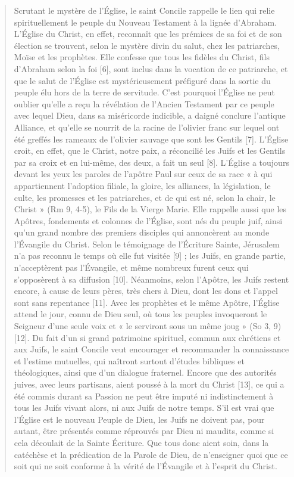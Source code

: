 \begin{quote}
Scrutant le mystère de l’Église, le saint Concile rappelle le lien qui relie spirituellement le peuple du Nouveau Testament à la lignée d’Abraham.
L’Église du Christ, en effet, reconnaît que les prémices de sa foi et de son élection se trouvent, selon le mystère divin du salut, chez les patriarches, Moïse et les prophètes. Elle confesse que tous les fidèles du Christ, fils d’Abraham selon la foi [6], sont inclus dans la vocation de ce patriarche, et que le salut de l’Église est mystérieusement préfiguré dans la sortie du peuple élu hors de la terre de servitude. C’est pourquoi l’Église ne peut oublier qu’elle a reçu la révélation de l’Ancien Testament par ce peuple avec lequel Dieu, dans sa miséricorde indicible, a daigné conclure l’antique Alliance, et qu’elle se nourrit de la racine de l’olivier franc sur lequel ont été greffés les rameaux de l’olivier sauvage que sont les Gentils [7]. L’Église croit, en effet, que le Christ, notre paix, a réconcilié les Juifs et les Gentils par sa croix et en lui-même, des deux, a fait un seul [8].
L’Église a toujours devant les yeux les paroles de l’apôtre Paul sur ceux de sa race « à qui appartiennent l’adoption filiale, la gloire, les alliances, la législation, le culte, les promesses et les patriarches, et de qui est né, selon la chair, le Christ » (Rm 9, 4-5), le Fils de la Vierge Marie. Elle rappelle aussi que les Apôtres, fondements et colonnes de l’Église, sont nés du peuple juif, ainsi qu’un grand nombre des premiers disciples qui annoncèrent au monde l’Évangile du Christ.
Selon le témoignage de l’Écriture Sainte, Jérusalem n’a pas reconnu le temps où elle fut visitée [9] ; les Juifs, en grande partie, n’acceptèrent pas l’Évangile, et même nombreux furent ceux qui s’opposèrent à sa diffusion [10]. Néanmoins, selon l’Apôtre, les Juifs restent encore, à cause de leurs pères, très chers à Dieu, dont les dons et l’appel sont sans repentance [11]. Avec les prophètes et le même Apôtre, l’Église attend le jour, connu de Dieu seul, où tous les peuples invoqueront le Seigneur d’une seule voix et « le serviront sous un même joug » (So 3, 9) [12].
Du fait d’un si grand patrimoine spirituel, commun aux chrétiens et aux Juifs, le saint Concile veut encourager et recommander la connaissance et l’estime mutuelles, qui naîtront surtout d’études bibliques et théologiques, ainsi que d’un dialogue fraternel. Encore que des autorités juives, avec leurs partisans, aient poussé à la mort du Christ [13], ce qui a été commis durant sa Passion ne peut être imputé ni indistinctement à tous les Juifs vivant alors, ni aux Juifs de notre temps. S’il est vrai que l’Église est le nouveau Peuple de Dieu, les Juifs ne doivent pas, pour autant, être présentés comme réprouvés par Dieu ni maudits, comme si cela découlait de la Sainte Écriture. Que tous donc aient soin, dans la catéchèse et la prédication de la Parole de Dieu, de n’enseigner quoi que ce soit qui ne soit conforme à la vérité de l’Évangile et à l’esprit du Christ.

\end{quote}
